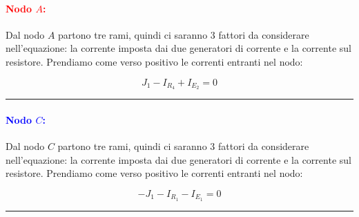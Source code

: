 \paragraph{\textcolor{red}{\textbf{Nodo $A$:}}}
\begin{minipage}[t]{0.6\textwidth}
\vspace{0pt}
Dal nodo $A$ partono tre rami, quindi ci saranno 3 fattori da considerare nell'equazione: la corrente imposta dai due generatori di corrente e la corrente sul resistore. Prendiamo come verso positivo le correnti entranti nel nodo:

\begin{equation}
        J_1 - I_{R_4} + I_{E_2} = 0
        \label{eq:nodoA_vincolo}
\end{equation}
\end{minipage}
\hfill
\begin{minipage}[t]{0.3\textwidth}
\vspace{0pt}
\centering
{}
\end{minipage}

\vspace{0.5cm}
\hrule
\vspace{0.5cm}

\paragraph{\textcolor{blue}{\textbf{Nodo $C$:}}}
\begin{minipage}[t]{0.6\textwidth}
\vspace{0pt}
Dal nodo $C$ partono tre rami, quindi ci saranno 3 fattori da considerare nell'equazione: la corrente imposta dai due generatori di corrente e la corrente sul resistore. Prendiamo come verso positivo le correnti entranti nel nodo:

\begin{equation}
        -J_1 - I_{R_1} - I_{E_1} = 0
        \label{eq:nodoC_vincolo}
\end{equation}
\end{minipage}
\hfill
\begin{minipage}[t]{0.3\textwidth}
\vspace{0pt}
\centering
{}
\end{minipage}

\vspace{0.5cm}
\hrule
\vspace{0.5cm}

